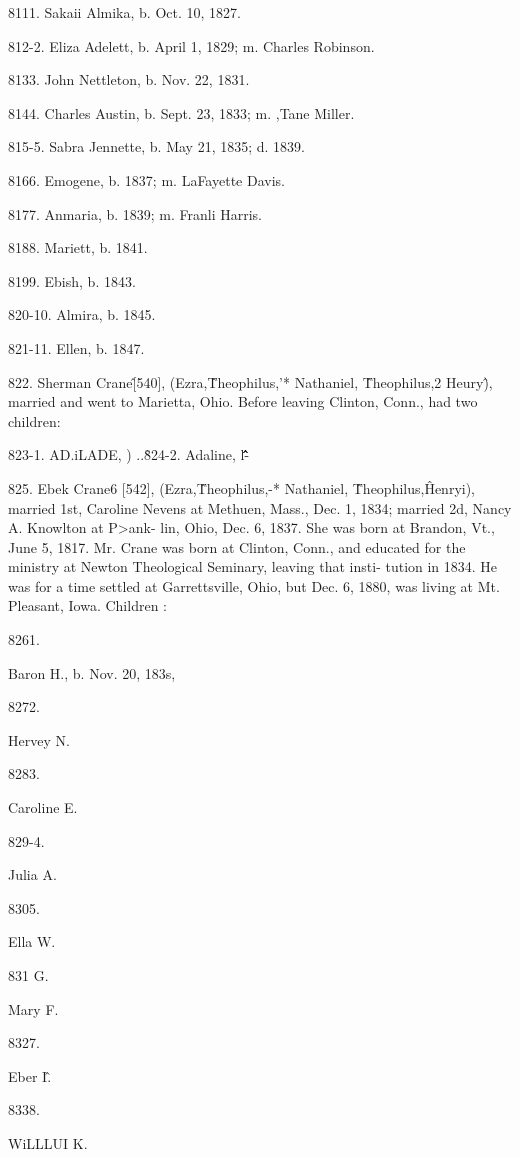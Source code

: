 8111. Sakaii Almika, b. Oct. 10, 1827. 

812-2. Eliza Adelett, b. April 1, 1829; m. Charles Robinson. 

8133. John Nettleton, b. Nov. 22, 1831. 

8144. Charles Austin, b. Sept. 23, 1833; m. ,Tane Miller. 

815-5. Sabra Jennette, b. May 21, 1835; d. 1839. 

8166. Emogene, b. 1837; m. LaFayette Davis. 

8177. Anmaria, b. 1839; m. Franli Harris. 

8188. Mariett, b. 1841. 

8199. Ebish, b. 1843. 

820-10. Almira, b. 1845. 

821-11. Ellen, b. 1847. 

822. Sherman Crane\^ [540], (Ezra,\^ Theophilus,'* Nathaniel, \^ 
Theophilus,2 Heury\^), married and went to Marietta, Ohio. 
Before leaving Clinton, Conn., had two children: 

823-1. AD.iLADE, ) ..\^ 
824-2. Adaline, l\^\^\^\^\^- 

825. Ebek Crane6 [542], (Ezra,\^ Theophilus,-* Nathaniel, \^ 
Theophilus,\^ Henryi), married 1st, Caroline Nevens at Methuen, 
Mass., Dec. 1, 1834; married 2d, Nancy A. Knowlton at P>ank- 
lin, Ohio, Dec. 6, 1837. She was born at Brandon, Vt., June 5, 
1817. Mr. Crane was born at Clinton, Conn., and educated for 
the ministry at Newton Theological Seminary, leaving that insti- 
tution in 1834. He was for a time settled at Garrettsville, Ohio, 
but Dec. 6, 1880, was living at Mt. Pleasant, Iowa. Children : 



8261. 


Baron H., b. Nov. 20, 183s, 


8272. 


Hervey N. 


8283. 


Caroline E. 


829-4. 


Julia A. 


8305. 


Ella W. 


831 G. 


Mary F. 


8327. 


Eber I\^. 


8338. 


WiLLLUI K. 




